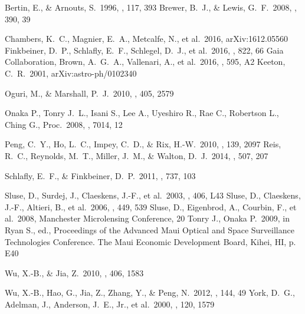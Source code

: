 \documentclass[manuscript]{aastex}
\begin{document}
\begin{thebibliography}{}


 Bertin, E., \& Arnouts, S.\ 1996, \aaps, 117, 393 
 Brewer, B.~J., \& Lewis, G.~F.\ 2008, \mnras, 390, 39 

 Chambers, K.~C., Magnier, E.~A., Metcalfe, N., et al.\ 2016, arXiv:1612.05560 
 Finkbeiner, D.~P., Schlafly, E.~F., Schlegel, D.~J., et al.\ 2016, \apj, 822, 66
 Gaia Collaboration, Brown, A.~G.~A., Vallenari, A., et al.\ 2016, \aap, 595, A2 
 Keeton, C.~R.\ 2001, arXiv:astro-ph/0102340 

 Oguri, M., \& Marshall, P.~J.\ 2010, \mnras, 405, 2579 

 Onaka P., Tonry J.~L., Isani S., Lee A., Uyeshiro R., Rae C., Robertson L., Ching G., Proc.\ 2008, \procspie, 7014, 12

 Peng, C.~Y., Ho, L.~C., Impey, C.~D., \& Rix, H.-W.\ 2010, \aj, 139, 2097 
 Reis, R.~C., Reynolds, M.~T., Miller, J.~M., \& Walton, D.~J.\ 2014, \nat, 507, 207 

 Schlafly, E.~F., \& Finkbeiner, D.~P.\ 2011, \apj, 737, 103 

 Sluse, D., Surdej, J., Claeskens, J.-F., et al.\ 2003, \aap, 406, L43 
 Sluse, D., Claeskens, J.-F., Altieri, B., et al.\ 2006, \aap, 449, 539 
 Sluse, D., Eigenbrod, A., Courbin, F., et al.\ 2008, Manchester Microlensing Conference, 20 
 Tonry J., Onaka P.\ 2009, in Ryan S., ed., 
Proceedings of the Advanced Maui Optical and Space Surveillance Technologies Conference.
The Maui Economic Development Board, Kihei, HI, p. E40

 Wu, X.-B., \& Jia, Z.\ 2010, \mnras, 406, 1583 

 Wu, X.-B., Hao, G., Jia, Z., Zhang, Y., \& Peng, N.\ 2012, \aj, 144, 49 
 York, D.~G., Adelman, J., Anderson, J.~E., Jr., et al.\ 2000, \aj, 120, 1579 


\clearpage



\end{thebibliography}
\end{document}
